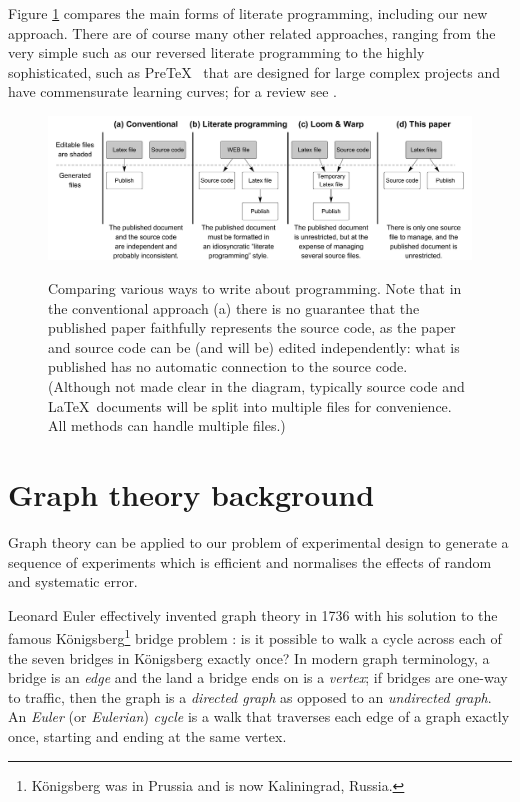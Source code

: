 \documentclass[12pt]{article}
\def\mycaption#1{\sf\bfseries\caption{\sf #1}}
\begin{document}

Figure \ref{fig:lp} compares the main forms of literate programming, including our new approach. There are of course many other related approaches, ranging from the very simple such as our reversed literate programming to the highly sophisticated, such as Pre\TeX\ \cite{pretex} that are designed for large complex projects and have commensurate learning curves; for a review see \cite{warp}.

\def\mycaption#1{\sf\bfseries\caption{\sf #1}}
\begin{figure}
\begin{center}
\includegraphics[width=.9\textwidth]{figures/literateProgramming.pdf}
\end{center}
\mycaption{Comparing various ways to write about programming. Note that in the conventional approach (a) there is no guarantee that the published paper faithfully represents the source code, as the paper and source code can be (and will be) edited independently: what is published has no automatic connection to the source code. (Although not made clear in the diagram, typically source code and \LaTeX\ documents will be split into multiple files for convenience. All methods can handle multiple files.)}
\label{fig:lp}
\end{figure}

\section{Graph theory background}\label{graphtheory}
Graph theory can be applied to our problem of experimental design to generate a sequence of experiments which is efficient and normalises the effects of random and systematic error.

Leonard Euler effectively invented graph theory in 1736 with his solution to the famous K\"onigsberg\footnote{K\"onigsberg was in Prussia and is now Kaliningrad, Russia.} bridge problem \cite{euler,wilson}: is it possible to walk a cycle across each of the seven bridges in K\"onigsberg exactly once? In modern graph terminology, a bridge is an \emph{edge\/} and the land a bridge ends on is a \emph{vertex\/}; if bridges are one-way to traffic, then the graph is a \emph{directed graph\/} as opposed to an \emph{undirected graph\/}. An \emph{Euler\/} (or \emph{Eulerian\/}) \emph{cycle\/} is a walk that traverses each edge of a graph exactly once, starting and ending at the same vertex.%
\end{document}
